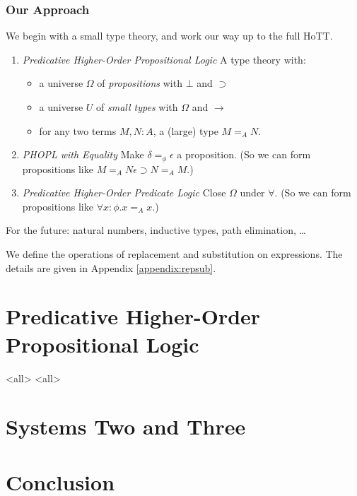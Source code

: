 \begin{frame}
\frametitle{Our Approach}
We begin with a small type theory, and work our way up to the full HoTT.
\begin{enumerate}
\item \emph{Predicative Higher-Order Propositional Logic} A type theory with:
  \begin{itemize}
  \item a universe $\Omega$ of \emph{propositions} with $\bot$ and $\supset$
  \item a universe $U$ of \emph{small types} with $\Omega$ and $\rightarrow$
  \item for any two terms $M, N : A$, a (large) type $M =_A N$.
  \end{itemize}
\item \emph{PHOPL with Equality}
Make $\delta =_\phi \epsilon$ a proposition.  (So we can form propositions like $M =_A N \epsilon \supset N =_A M$.)
\item \emph{Predicative Higher-Order Predicate Logic} Close $\Omega$ under $\forall$.  (So we can form propositions like $\forall x : \phi. x =_A x$.)
\end{enumerate}
For the future: natural numbers, inductive types, path elimination, \ldots
\end{frame}





We define the operations of replacement and substitution on
expressions.  The details are given in Appendix \ref{appendix:repsub}.








\section{Predicative Higher-Order Propositional Logic}


\mode<all>{}
\mode<all>{}

\section{Systems Two and Three}

\section{Conclusion}

